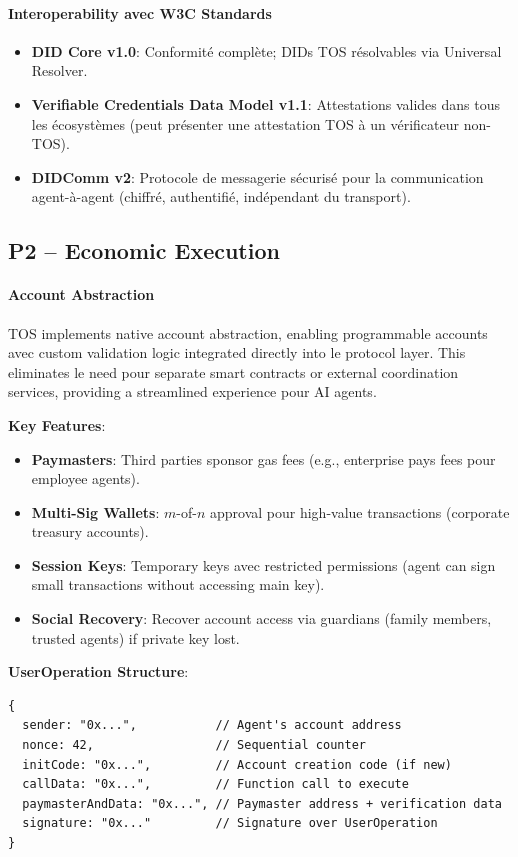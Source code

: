 \documentclass[11pt]{article}
\begin{document}
\paragraph{Interoperability avec W3C Standards}
\begin{itemize}[noitemsep]
  \item \textbf{DID Core v1.0}: Conformité complète; DIDs TOS résolvables via Universal Resolver.
  \item \textbf{Verifiable Credentials Data Model v1.1}: Attestations valides dans tous les écosystèmes (peut présenter une attestation TOS à un vérificateur non-TOS).
  \item \textbf{DIDComm v2}: Protocole de messagerie sécurisé pour la communication agent-à-agent (chiffré, authentifié, indépendant du transport).
\end{itemize}

\subsection{P2 -- Economic Execution}
\label{sec:pillar-economic}

\paragraph{Account Abstraction}
TOS implements native account abstraction, enabling programmable accounts avec custom validation logic integrated directly into le protocol layer. This eliminates le need pour separate smart contracts or external coordination services, providing a streamlined experience pour AI agents.

\textbf{Key Features}:
\begin{itemize}[noitemsep]
  \item \textbf{Paymasters}: Third parties sponsor gas fees (e.g., enterprise pays fees pour employee agents).
  \item \textbf{Multi-Sig Wallets}: $m$-of-$n$ approval pour high-value transactions (corporate treasury accounts).
  \item \textbf{Session Keys}: Temporary keys avec restricted permissions (agent can sign small transactions without accessing main key).
  \item \textbf{Social Recovery}: Recover account access via guardians (family members, trusted agents) if private key lost.
\end{itemize}

\textbf{UserOperation Structure}:
\begin{verbatim}
{
  sender: "0x...",           // Agent's account address
  nonce: 42,                 // Sequential counter
  initCode: "0x...",         // Account creation code (if new)
  callData: "0x...",         // Function call to execute
  paymasterAndData: "0x...", // Paymaster address + verification data
  signature: "0x..."         // Signature over UserOperation
}
\end{verbatim}
\end{document}
